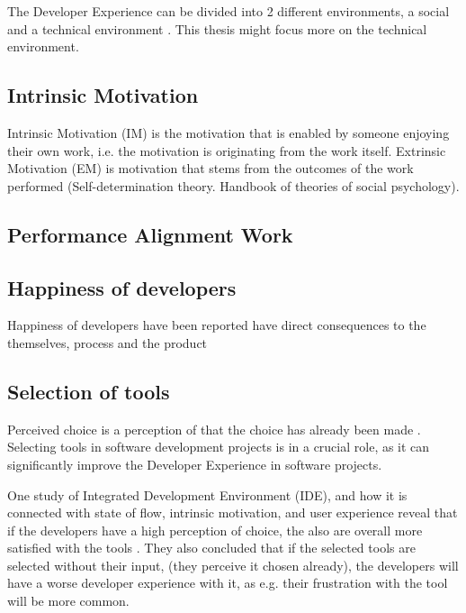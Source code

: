 \documentclass[english, 12pt, a4paper, sci, utf8, a-1b, online]{aaltothesis}
\begin{document}
The Developer Experience can be divided into 2 different environments, a social and a technical environment \cite{fagerholm-doctoral-thesis}. This thesis might focus more on the technical environment.

\subsection{Intrinsic Motivation}

Intrinsic Motivation (IM) is the motivation that is enabled by someone enjoying their own work, i.e. the motivation is originating from the work itself. Extrinsic Motivation (EM) is motivation that stems from the outcomes of the work performed \cite{kuusinen-flow} (Self-determination theory. Handbook of theories of social psychology).

\subsection{Performance Alignment Work}


\subsection{Happiness of developers}

Happiness of developers have been reported have direct consequences to the themselves, process and the product \cite{unhappy-developers}

\subsection{Selection of tools}

Perceived choice is a perception of that the choice has already been made \cite{kuusinen-flow}. Selecting tools in software development projects is in a crucial role, as it can significantly improve the Developer Experience in software projects.

One study of Integrated Development Environment (IDE), and how it is connected with state of flow, intrinsic motivation, and user experience reveal that if the developers have a high perception of choice, the also are overall more satisfied with the tools \cite{kuusinen-flow}. They also concluded that if the selected tools are selected without their input, (they perceive it chosen already), the developers will have a worse developer experience with it, as e.g. their frustration with the tool will be more common.
\end{document}
